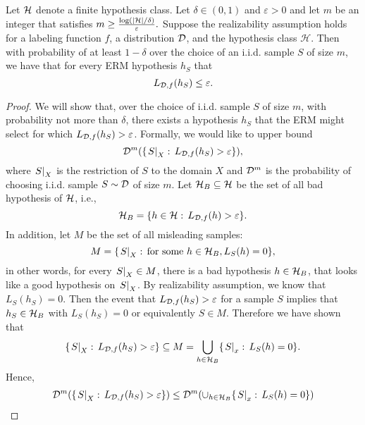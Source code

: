 \documentclass[11pt,a4paper]{article}
\begin{document}
\begin{proposition}
Let $\mathcal{H}$ denote a finite hypothesis class. Let $\delta \in (0,1)$ and $\varepsilon >0$ and let $m$ be an integer that satisfies $m\ge \frac{\log(|\mathcal{H}|/\delta)}{\varepsilon}.$ Suppose the realizability assumption holds for a labeling function $f$, a distribution $\mathcal{D}$, and the hypothesis class $\mathcal{H}$. Then with probability of at least $1-\delta$ over the choice of an i.i.d. sample $S$ of size $m$, we have that for every ERM hypothesis $h_S$ that
\begin{equation*}
    L_{\mathcal{D}, f}(h_S)\le \varepsilon.
\end{equation*}
\end{proposition}

\begin{proof}
We will show that, over the choice of i.i.d. sample $S$ of size $m$, with probability not more than $\delta$, there exists a hypothesis $h_S$ that the ERM might select for which $L_{\mathcal{D}, f}(h_S)> \varepsilon$. Formally, we would like to upper bound
\begin{equation}\label{eqn:upper_bound_qty}
\mathcal{D}^m(\{\left.S\right|_{X}:\, L_{\mathcal{D},f}(h_S)>\varepsilon\}),
\end{equation}
where $\left.S\right|_{X}$ is the restriction of $S$ to the domain $X$ and $\mathcal{D}^m$ is the probability of choosing i.i.d. sample $S\sim \mathcal{D}$ of size $m$. Let $\mathcal{H}_B\subseteq \mathcal{H}$ be the set of all bad hypothesis of $\mathcal{H}$, i.e.,
\begin{equation*}
\mathcal{H}_B = \{h\in \mathcal{H}:\, L_{\mathcal{D}, f}(h)>\varepsilon\}.
\end{equation*}
In addition, let $M$ be the set of all misleading samples:
\begin{equation*}
M = \{ \left.S\right|_{X}:\,\text{for some }h\in \mathcal{H}_B, L_S(h) = 0 \},
\end{equation*}
in other words, for every $\left.S\right|_{X}\in M$, there is a bad hypothesis $h\in \mathcal{H}_B$, that looks like a good hypothesis on $\left.S\right|_{X}$. By realizability assumption, we know that $L_S(h_S) = 0$. Then the event that $L_{\mathcal{D},f}(h_S)>\varepsilon$ for a sample $S$ implies that $h_S\in \mathcal{H}_B$ with $L_S(h_S) = 0$ or equivalently $S\in M$. Therefore we have shown that
\begin{equation}\label{eqn:set_inclusion_expr}
\{\left.S\right|_{X}:\, L_{\mathcal{D},f}(h_S)>\varepsilon\} \subseteq M = \bigcup_{h\in \mathcal{H}_B} \{\left.S\right|_{x}:\, L_S(h) = 0\}.
\end{equation}
Hence,
\begin{align*}
\Dist^m(\{\bigvert{S}{X}:\, L_{\Dist,f}(h_S)>\varepsilon\}) &\le \Dist^m(\cup_{h\in \h_B} \{\bigvert{S}{x}:\, L_S(h) = 0\})\\

\end{align*}
\end{proof}
\end{document}
